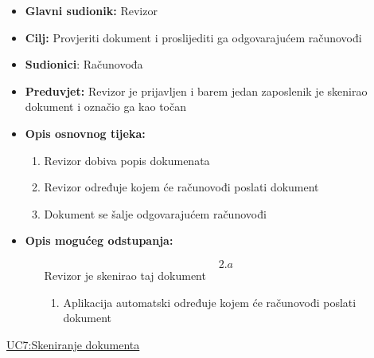 \documentclass{article} %
\begin{document}
\begin{itemize}
	\item \textbf{Glavni sudionik:} Revizor
	
	
	\item \textbf{Cilj:} Provjeriti dokument i proslijediti ga odgovarajućem računovođi
	
	
	\item \textbf{Sudionici}: Računovođa
	
	
	\item \textbf{Preduvjet:} Revizor je prijavljen i barem jedan zaposlenik je skenirao dokument i označio ga kao točan
	
	
	\item \textbf{Opis osnovnog tijeka:} 
	\begin{enumerate}
		\item Revizor dobiva popis dokumenata
		
		
		\item Revizor određuje kojem će računovođi poslati dokument
		
		
		\item Dokument se šalje odgovarajućem računovođi
		
	\end{enumerate}
	\item \textbf{Opis mogućeg odstupanja:}
	
	\begin{enumerate}
		\item[$$2.a$$] Revizor je skenirao taj dokument
		
		\begin{enumerate}[label=\arabic*.]
			\item Aplikacija automatski određuje kojem će računovođi poslati dokument
			
		\end{enumerate}
	\end{enumerate}
\end{itemize}


\noindent\underline{UC7:Skeniranje dokumenta}
\end{document}
